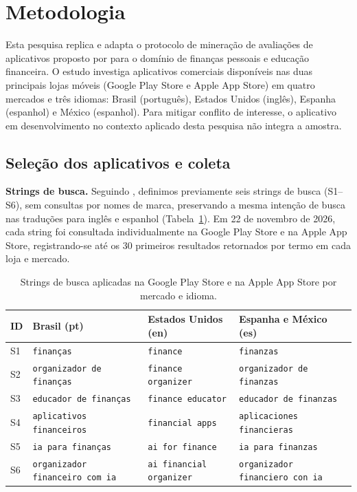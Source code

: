 \section{Metodologia}

Esta pesquisa replica e adapta o protocolo de mineração de avaliações de aplicativos \parencite{gencnayebi2017} proposto por \textcite{alsebayel2025} para o domínio de finanças pessoais e educação financeira. O estudo investiga aplicativos comerciais disponíveis nas duas principais lojas móveis (Google Play Store e Apple App Store) em quatro mercados e três idiomas: Brasil (português), Estados Unidos (inglês), Espanha (espanhol) e México (espanhol). Para mitigar conflito de interesse, o aplicativo em desenvolvimento no contexto aplicado desta pesquisa não integra a amostra.

\subsection{Seleção dos aplicativos e coleta}

\textbf{Strings de busca.} Seguindo \textcite{alsebayel2025}, definimos previamente seis strings de busca (S1--S6), sem consultas por nomes de marca, preservando a mesma intenção de busca nas traduções para inglês e espanhol (Tabela~\ref{tab:strings}). Em 22 de novembro de 2026, cada string foi consultada individualmente na Google Play Store e na Apple App Store, registrando-se até os 30 primeiros resultados retornados por termo em cada loja e mercado.

\begin{table}[htbp]
\centering
\caption{Strings de busca aplicadas na Google Play Store e na Apple App Store por mercado e idioma.}
\label{tab:strings}
\small
\begin{tabular}{llll}
\toprule
\textbf{ID} & \textbf{Brasil (pt)} & \textbf{Estados Unidos (en)} & \textbf{Espanha e México (es)} \\
\midrule
S1 & \texttt{finanças} & \texttt{finance} & \texttt{finanzas} \\
S2 & \texttt{organizador de finanças} & \texttt{finance organizer} & \texttt{organizador de finanzas} \\
S3 & \texttt{educador de finanças} & \texttt{finance educator} & \texttt{educador de finanzas} \\
S4 & \texttt{aplicativos financeiros} & \texttt{financial apps} & \texttt{aplicaciones financieras} \\
S5 & \texttt{ia para finanças} & \texttt{ai for finance} & \texttt{ia para finanzas} \\
S6 & \texttt{organizador financeiro com ia} & \texttt{ai financial organizer} & \texttt{organizador financiero con ia} \\
\bottomrule
\end{tabular}
\end{table}

